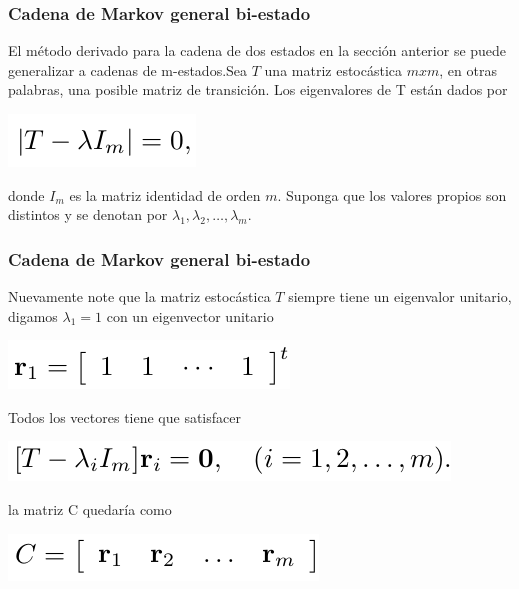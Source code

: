 \documentclass[spanish]{beamer}
\begin{document}
\begin{frame}
\frametitle{Cadena de Markov general bi-estado}
El método derivado para la cadena de dos estados en la sección anterior se puede generalizar a cadenas de m-estados.Sea $T$ una matriz estocástica $m x m$, en otras palabras, una posible matriz de transición. Los eigenvalores de T están dados por
\begin{center}
\includegraphics[scale=0.4]{im19}
\end{center}
donde $I_{m}$ es la matriz identidad de orden $m$. Suponga que los valores propios son distintos y se denotan por $\lambda_{1}, \lambda_{2},\ldots ,\lambda_{m}$.
\end{frame}
\begin{frame}
\frametitle{Cadena de Markov general bi-estado}
Nuevamente note que la matriz estocástica $T$ siempre tiene un eigenvalor unitario, digamos $\lambda_{1}=1$ con un eigenvector unitario

\begin{center}
\includegraphics[scale=0.4]{im20}
\end{center}
Todos los vectores tiene que satisfacer 
\begin{center}
\includegraphics[scale=0.4]{im21}
\end{center}
la matriz C quedaría como 
\begin{center}
\includegraphics[scale=0.4]{im22}
\end{center}
\end{frame}
\end{document}
